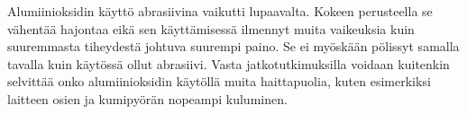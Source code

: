 \documentclass[12pt,a4paper,finnish]{tutthesis}
\begin{document}
Alumiinioksidin käyttö abrasiivina vaikutti lupaavalta. Kokeen perusteella se vähentää hajontaa eikä sen käyttämisessä ilmennyt muita vaikeuksia kuin suuremmasta tiheydestä johtuva suurempi paino. Se ei myöskään pölissyt samalla tavalla kuin käytössä ollut abrasiivi. Vasta jatkotutkimuksilla voidaan kuitenkin selvittää onko alumiinioksidin käytöllä muita haittapuolia, kuten esimerkiksi laitteen osien ja kumipyörän nopeampi kuluminen.























\end{document}
